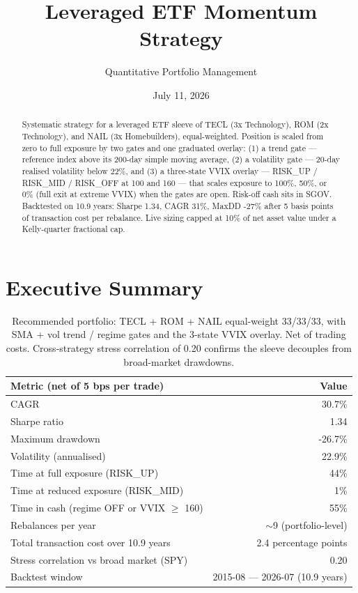 \documentclass[11pt,a4paper]{article}
\title{\textbf{Leveraged ETF Momentum Strategy}}
\author{Quantitative Portfolio Management}
\date{July 11, 2026}
\begin{document}
\maketitle

\begin{abstract}
Systematic strategy for a leveraged ETF sleeve of TECL (3x Technology), ROM (2x Technology), and NAIL (3x Homebuilders), equal-weighted. Position is scaled from zero to full exposure by two gates and one graduated overlay: (1) a trend gate --- reference index above its 200-day simple moving average, (2) a volatility gate --- 20-day realised volatility below 22\%, and (3) a three-state VVIX overlay --- RISK\_UP / RISK\_MID / RISK\_OFF at 100 and 160 --- that scales exposure to 100\%, 50\%, or 0\% (full exit at extreme VVIX) when the gates are open. Risk-off cash sits in SGOV. Backtested on 10.9 years: Sharpe 1.34, CAGR 31\%, MaxDD -27\% after 5 basis points of transaction cost per rebalance. Live sizing capped at 10\% of net asset value under a Kelly-quarter fractional cap.
\end{abstract}

\tableofcontents
\vspace{0.5em}

\section{Executive Summary}

\begin{table}[H]
\centering
\renewcommand{\arraystretch}{1.2}
\small
\begin{tabular}{lr}
\toprule
\textbf{Metric (net of 5 bps per trade)} & \textbf{Value} \\
\midrule
CAGR                    & 30.7\% \\
Sharpe ratio            & 1.34 \\
Maximum drawdown        & -26.7\% \\
Volatility (annualised) & 22.9\% \\
Time at full exposure (RISK\_UP)  & 44\% \\
Time at reduced exposure (RISK\_MID) & 1\% \\
Time in cash (regime OFF or VVIX $\geq$ 160) & 55\% \\
Rebalances per year     & $\sim$9 (portfolio-level) \\
Total transaction cost over 10.9 years & 2.4 percentage points \\
Stress correlation vs broad market (SPY) & 0.20 \\
Backtest window & 2015-08 --- 2026-07 (10.9 years) \\
\bottomrule
\end{tabular}
\caption{Recommended portfolio: TECL + ROM + NAIL equal-weight 33/33/33, with SMA + vol trend / regime gates and the 3-state VVIX overlay. Net of trading costs. Cross-strategy stress correlation of 0.20 confirms the sleeve decouples from broad-market drawdowns.}
\end{table}
\end{document}
